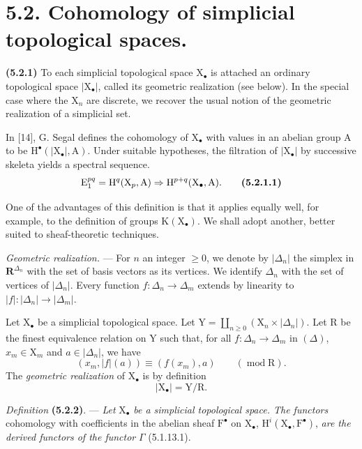 \documentclass[11pt,leqno]{article}
\begin{document}
\section*{5.2. Cohomology of simplicial topological spaces.}

\textbf{(5.2.1)} To each simplicial topological space \(\mathrm{X}_{\bullet}\) is attached an ordinary topological space \(\lvert\mathrm{X}_{\bullet}\rvert\), called its geometric realization (see below). In the special case where the \(\mathrm{X}_n\) are discrete, we recover the usual notion of the geometric realization of a simplicial set.

In [14], G. Segal defines the cohomology of \(\mathrm{X}_{\bullet}\) with values in an abelian group \(\mathrm{A}\) to be \(\mathrm{H}^{\bullet}(\lvert\mathrm{X}_{\bullet}\rvert,\mathrm{A})\). Under suitable hypotheses, the filtration of \(\lvert\mathrm{X}_{\bullet}\rvert\) by successive skeleta yields a spectral sequence.
\[
\mathrm{E}_1^{pq}
=\mathrm{H}^q(\mathrm{X}_p,\mathrm{A})
\Rightarrow\mathrm{H}^{p+q}(\mathrm{X}_{\bullet},\mathrm{A}).
\tag*{\textbf{(5.2.1.1)}}
\]

One of the advantages of this definition is that it applies equally well, for example, to the definition of groups \(\mathrm{K}(\mathrm{X}_{\bullet})\). We shall adopt another, better suited to sheaf-theoretic techniques.

\textit{Geometric realization.} — For \(n\) an integer \(\geq0\), we denote by \(\lvert\Delta_n\rvert\) the simplex in \(\mathbf{R}^{\Delta_n}\) with the set of basis vectors as its vertices. We identify \(\Delta_n\) with the set of vertices of \(\lvert\Delta_n\rvert\). Every function \(f:\Delta_n\to\Delta_m\) extends by linearity to \(\lvert f\rvert:\lvert\Delta_n\rvert\to\lvert\Delta_m\rvert\).

Let \(\mathrm{X}_{\bullet}\) be a simplicial topological space. Let \(\mathrm{Y}=\coprod\limits_{n\geq0}(\mathrm{X}_n\times\lvert\Delta_n\rvert)\). Let \(\mathrm{R}\) be the finest equivalence relation on \(\mathrm{Y}\) such that, for all \(f:\Delta_n\to\Delta_m\) in \((\Delta)\), \(x_m\in\mathrm{X}_m\) and \(a\in\lvert\Delta_n\rvert\), we have
\[
(x_m,\lvert f\rvert(a))\equiv(f(x_m),a)\qquad(\operatorname{mod}\mathrm{R}).
\]
The \textit{geometric realization} of \(\mathrm{X}_{\bullet}\) is by definition
\[
\lvert\mathrm{X}_{\bullet}\rvert=\mathrm{Y}/\mathrm{R}.
\]

\textit{Definition} \textbf{(5.2.2)}. — \textit{Let} \(\mathrm{X}_{\bullet}\) \textit{be a simplicial topological space. The functors} cohomology with coefficients in the abelian sheaf \(\mathrm{F}^{\bullet}\) on \(\mathrm{X}_{\bullet}\), \(\mathrm{H}^i(\mathrm{X}_{\bullet},\mathrm{F}^{\bullet})\), \textit{are the derived functors of the functor} \(\Gamma\) (5.1.13.1).
\end{document}
